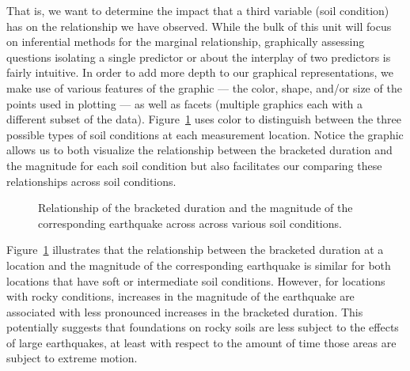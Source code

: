 \documentclass[
  letterpaper,
  DIV=11,
  numbers=noendperiod]{scrreprt}
\theoremstyle{definition}
\theoremstyle{definition}
\theoremstyle{plain}
\theoremstyle{remark}
\begin{document}
That is, we want to determine the impact that a third variable (soil
condition) has on the relationship we have observed. While the bulk of
this unit will focus on inferential methods for the marginal
relationship, graphically assessing questions isolating a single
predictor or about the interplay of two predictors is fairly intuitive.
In order to add more depth to our graphical representations, we make use
of various features of the graphic --- the color, shape, and/or size of
the points used in plotting --- as well as facets (multiple graphics
each with a different subset of the data).
Figure~\ref{fig-regsummaries-color} uses color to distinguish between
the three possible types of soil conditions at each measurement
location. Notice the graphic allows us to both visualize the
relationship between the bracketed duration and the magnitude for each
soil condition but also facilitates our comparing these relationships
across soil conditions.

\begin{figure}


\caption{\label{fig-regsummaries-color}Relationship of the bracketed
duration and the magnitude of the corresponding earthquake across across
various soil conditions.}

\end{figure}%

Figure~\ref{fig-regsummaries-color} illustrates that the relationship
between the bracketed duration at a location and the magnitude of the
corresponding earthquake is similar for both locations that have soft or
intermediate soil conditions. However, for locations with rocky
conditions, increases in the magnitude of the earthquake are associated
with less pronounced increases in the bracketed duration. This
potentially suggests that foundations on rocky soils are less subject to
the effects of large earthquakes, at least with respect to the amount of
time those areas are subject to extreme motion.
\end{document}
